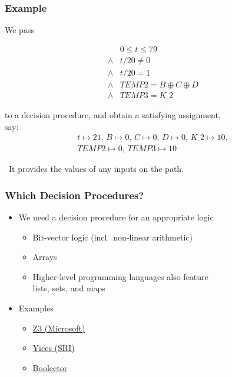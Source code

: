 \begin{frame}
\frametitle{Example}

We pass

\[ \begin{array}{ll}
      & 0 \le t \le 79 \\
\land & t/20\not=0 \\
\land & t/20=1 \\
\land & \mathit{TEMP2}=B \oplus C \oplus D \\
\land & \mathit{TEMP3}=K\_2
\end{array} \]

to a decision procedure, and obtain a \alert{satisfying assignment},\\
say:
\[ \begin{array}{c}
t\mapsto 21,\, B\mapsto 0,\, C\mapsto 0,\, D\mapsto 0,\, K\_2\mapsto 10,\\
\mathit{TEMP2}\mapsto 0,\, \mathit{TEMP3}\mapsto 10 
\end{array}\]

\vfill

\mycheck~It provides the values of any inputs on the path.

\end{frame}


\begin{frame}
\frametitle{Which Decision Procedures?}

\begin{itemize}

\item We need a decision procedure for an appropriate logic
\begin{itemize}
\item Bit-vector logic (incl.~non-linear arithmetic)
\item Arrays
\item Higher-level programming languages also feature\\
lists, sets, and maps
\end{itemize}
\vfill

\item Examples
\begin{itemize}
\item \href{http://research.microsoft.com/en-us/um/redmond/projects/z3/}
{Z3 (Microsoft)}

\item \href{http://yices.csl.sri.com/}{Yices (SRI)}

\item \href{http://fmv.jku.at/boolector/}{Boolector}
\end{itemize}

\end{itemize}

\end{frame}

